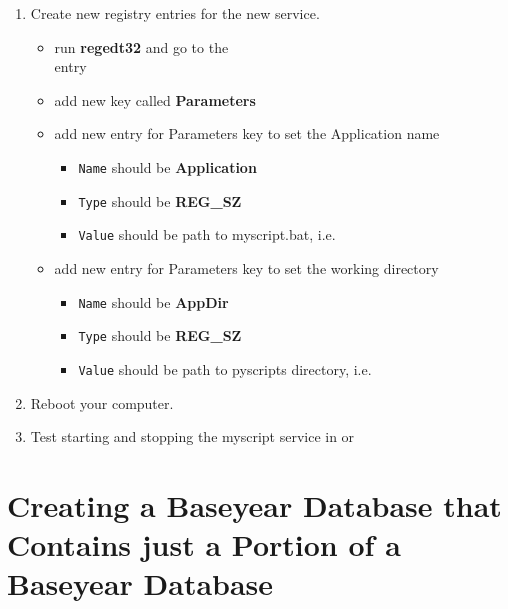\begin{enumerate}
\item Create new registry entries for the new service.
	\begin{itemize}
	    \item run {\bf regedt32} and go to the \\ 
	    	   entry
    	\item add new key  called {\bf Parameters}
    	\item add new entry for Parameters key  to set the Application name
           \begin{itemize}
           		\item \verb|Name| should be {\bf Application}
           		\item \verb|Type| should be {\bf REG_SZ} 
           		\item \verb|Value| should be path to myscript.bat, 
           			  i.e. {\bf {}}
    		\end{itemize}
    	\item add new entry for Parameters key  to set the working directory
           \begin{itemize}           
 	       		\item \verb|Name| should be {\bf AppDir}
        	  	\item \verb|Type| should be {\bf REG_SZ} 
      	    	\item \verb|Value| should be path to pyscripts directory, i.e. {\bf {}}
      	    \end{itemize} 
	\end{itemize}

\item Reboot your computer.

\item Test starting and stopping the myscript service in 
	 or 
\end{enumerate}

\section{Creating a Baseyear Database that Contains just a Portion 
of a Baseyear Database}

